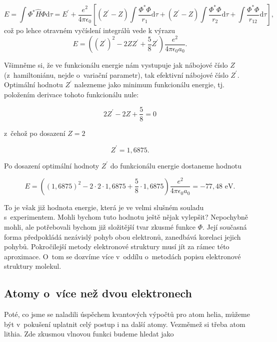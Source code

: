 \begin{equation}
E = \int \Phi^{\ast} \hat{H} \Phi \mathrm{d}\tau = E^{\prime} + \frac{e^2}{4 \pi \epsilon_0} \left[ (Z^{\prime} - Z) \int \frac{\Phi^{\ast}\Phi}{r_1} \mathrm{d}\tau + (Z^{\prime} - Z) \int \frac{\Phi^{\ast}\Phi}{r_2} \mathrm{d}\tau + \int \frac{\Phi^{\ast}\Phi}{r_{12}} \mathrm{d}\tau \right],
\label{rov:VE-19}
\end{equation}
což po lehce otravném vyčíslení integrálů vede k výrazu
\begin{equation}
E = \left( (Z^{\prime})^2 - 2 Z Z^{\prime} + \frac{5}{8} Z^{\prime} \right) \frac{e^2}{4 \pi \epsilon_0 a_0}.
\label{rov:VE-20}
\end{equation}

\noindent Všimněme si, že ve funkcionálu energie nám vystupuje jak nábojové číslo $Z$ (z~hamiltoniánu, nejde o~variační parametr), tak efektivní nábojové číslo $Z^{\prime}$. Optimální hodnotu $Z^{\prime}$ nalezneme jako minimum funkcionálu energie, tj. položením derivace tohoto funkcionálu nule:

\begin{equation}
2 Z^{\prime} - 2Z + \frac{5}{8} = 0 \nonumber
\end{equation}

\noindent z~čehož po dosazení $Z = 2$

\begin{equation}
Z^{\prime} = 1{,}6875. \nonumber
\end{equation}

\noindent Po dosazení optimální hodnoty $Z^{\prime}$ do funkcionálu energie dostaneme hodnotu 

\begin{equation}
E = \left( (1{,}6875)^2 - 2 \cdot 2 \cdot 1{,}6875 + \frac{5}{8} \cdot 1{,}6875 \right) \frac{e^2}{4 \pi \epsilon_0 a_0} = - 77{,}48 \mbox{ eV}.
\label{rov:VE-21}
\end{equation}

\noindent To je však již hodnota energie, která je ve velmi slušném souladu s~experimentem. Mohli bychom tuto hodnotu ještě nějak vylepšit? Nepochybně mohli, ale potřebovali bychom již složitější tvar zkusmé funkce $\Phi$. Její současná forma předpokládá nezávislý pohyb obou elektronů, zanedbává korelaci jejich pohybů. Pokročilejší metody elektronové struktury musí jít za rámec této aproximace. O~tom se dozvíme více v~oddílu o~metodách popisu elektronové struktury molekul. 

\subsection{Atomy o~více než dvou elektronech}
Poté, co jsme se naladili úspěchem kvantových výpočtů pro atom helia, můžeme být v~pokušení uplatnit celý postup i na další atomy. Vezměmež si třeba atom lithia. Zde zkusmou vlnovou funkci budeme hledat jako

